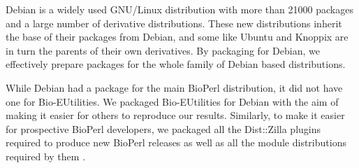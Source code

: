 
Debian is a widely used GNU/Linux
distribution with more than 21000 packages and a large
number of derivative distributions.  These new distributions
inherit the base of their packages from Debian, and some like Ubuntu
and Knoppix are in turn the parents of their own derivatives.  By packaging
for Debian, we effectively prepare packages for the whole family of
Debian based distributions.

While Debian had a package for the main BioPerl distribution, it did
not have one for Bio-EUtilities.  We packaged Bio-EUtilities for
Debian with the aim of making it easier for
others to reproduce our results.
Similarly, to make it easier for prospective BioPerl
developers, we packaged all the Dist::Zilla plugins required to produce
new BioPerl releases as well
as all the module distributions required by them
.

